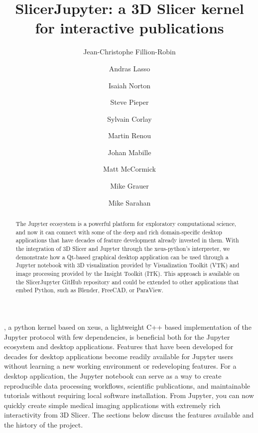 \documentclass{IEEEcsmag}
\begin{document}

\title{SlicerJupyter: a 3D Slicer kernel for interactive publications}

\author{Jean-Christophe Fillion-Robin}

\author{Andras Lasso}

\author{Isaiah Norton}

\author{Steve Pieper}

\author{Sylvain Corlay}

\author{Martin Renou}

\author{Johan Mabille}

\author{Matt McCormick}

\author{Mike Grauer}

\author{Mike Sarahan}


\begin{abstract}
The Jupyter ecosystem is a powerful platform for exploratory computational science, and now it can connect with some of the deep and rich domain-specific desktop applications that have decades of feature development already invested in them. With the integration of 3D Slicer and Jupyter through the xeus-python’s interpreter, we demonstrate how a Qt-based graphical desktop application can be used through a Jupyter notebook with 3D visualization provided by Visualization Toolkit (VTK) and image processing provided by the Insight Toolkit (ITK). This approach is available on the SlicerJupyter GitHub repository and could be extended to other applications that embed Python, such as Blender, FreeCAD, or ParaView.
\end{abstract}

\maketitle


, a python kernel based on xeus, a lightweight C++ based implementation of the Jupyter protocol with few dependencies, is beneficial both for the Jupyter ecosystem and desktop applications. Features that have been developed for decades for desktop applications become readily available for Jupyter users without learning a new working environment or redeveloping features. For a desktop application, the Jupyter notebook can serve as a way to create reproducible data processing workflows, scientific publications, and maintainable tutorials without requiring local software installation. From Jupyter, you can now quickly create simple medical imaging applications with extremely rich interactivity from 3D Slicer. The sections below discuss the features available and the history of the project.
\end{document}
